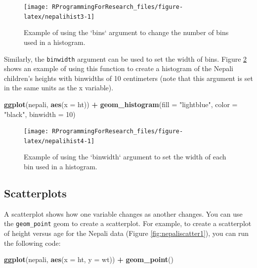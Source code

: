 \documentclass[]{book}
\makeatletter
\newenvironment{Shaded}{\begin{snugshade}}{\end{snugshade}}
\newcommand{\KeywordTok}[1]{\textcolor[rgb]{0.13,0.29,0.53}{\textbf{#1}}}
\newcommand{\DataTypeTok}[1]{\textcolor[rgb]{0.13,0.29,0.53}{#1}}
\newcommand{\DecValTok}[1]{\textcolor[rgb]{0.00,0.00,0.81}{#1}}
\newcommand{\StringTok}[1]{\textcolor[rgb]{0.31,0.60,0.02}{#1}}
\newcommand{\OperatorTok}[1]{\textcolor[rgb]{0.81,0.36,0.00}{\textbf{#1}}}
\newcommand{\NormalTok}[1]{#1}
\newenvironment{kframe}{%
\medskip{}
\setlength{\fboxsep}{.8em}
 \def\at@end@of@kframe{}%
 \ifinner\ifhmode%
  \def\at@end@of@kframe{\end{minipage}}%
  \begin{minipage}{\columnwidth}%
 \fi\fi%
 \def\FrameCommand##1{\hskip\@totalleftmargin \hskip-\fboxsep
 \colorbox{shadecolor}{##1}\hskip-\fboxsep
     \hskip-\linewidth \hskip-\@totalleftmargin \hskip\columnwidth}%
 \MakeFramed {\advance\hsize-\width
   \@totalleftmargin\z@ \linewidth\hsize
   \@setminipage}}%
 {\par\unskip\endMakeFramed%
 \at@end@of@kframe}
\renewenvironment{Shaded}{\begin{kframe}}{\end{kframe}}
\theoremstyle{definition}
\theoremstyle{definition}
\theoremstyle{definition}
\theoremstyle{remark}
\makeatother
\begin{document}
\begin{figure}

{\centering \texttt{[image: RProgrammingForResearch\_files/figure-latex/nepalihist3-1]} 

}

\caption{Example of using the `bins` argument to change the number of bins used in a histogram.}\label{fig:nepalihist3}
\end{figure}

Similarly, the \texttt{binwidth} argument can be used to set the width
of bins. Figure \ref{fig:nepalihist4} shows an example of using this
function to create a histogram of the Nepali children's heights with
binwidths of 10 centimeters (note that this argument is set in the same
units as the x variable).

\begin{Shaded}
\begin{Highlighting}[]
\KeywordTok{ggplot}\NormalTok{(nepali, }\KeywordTok{aes}\NormalTok{(}\DataTypeTok{x =}\NormalTok{ ht)) }\OperatorTok{+}\StringTok{ }
\StringTok{  }\KeywordTok{geom_histogram}\NormalTok{(}\DataTypeTok{fill =} \StringTok{"lightblue"}\NormalTok{, }\DataTypeTok{color =} \StringTok{"black"}\NormalTok{,}
                 \DataTypeTok{binwidth =} \DecValTok{10}\NormalTok{) }
\end{Highlighting}
\end{Shaded}

\begin{figure}

{\centering \texttt{[image: RProgrammingForResearch\_files/figure-latex/nepalihist4-1]} 

}

\caption{Example of using the `binwidth` argument to set the width of each bin used in a histogram.}\label{fig:nepalihist4}
\end{figure}

\subsection{Scatterplots}\label{scatterplots}

A scatterplot shows how one variable changes as another changes. You can
use the \texttt{geom\_point} geom to create a scatterplot. For example,
to create a scatterplot of height versus age for the Nepali data (Figure
\ref{fig:nepaliscatter1}), you can run the following code:

\begin{Shaded}
\begin{Highlighting}[]
\KeywordTok{ggplot}\NormalTok{(nepali, }\KeywordTok{aes}\NormalTok{(}\DataTypeTok{x =}\NormalTok{ ht, }\DataTypeTok{y =}\NormalTok{ wt)) }\OperatorTok{+}\StringTok{ }
\StringTok{  }\KeywordTok{geom_point}\NormalTok{()}
\end{Highlighting}
\end{Shaded}
\end{document}
